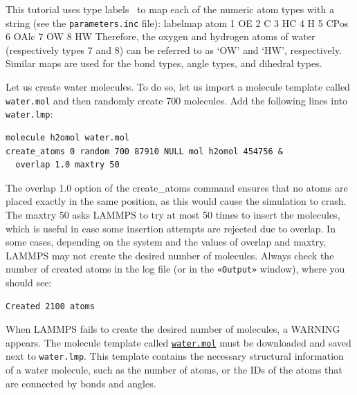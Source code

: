 \documentclass[9pt,tutorial]{livecoms}
\newcommand{\lmpcmd}[1]{\hspace{0pt}\colorbox{listing}{\textcolor{command}{\small{#1}}}\hspace{0pt}} %
\newcommand{\lmpcmdnote}[1]{\hspace{0pt}\colorbox{note_listing}{\textcolor{command}{\small{#1}}}\hspace{0pt}} %
\newcommand{\flecmd}[1]{\textcolor{command}{\texttt{#1}}} %
\newcommand{\guicmd}[1]{\textcolor{command}{\texttt{«#1»}}} %
\newcommand{\dwlcmd}[1]{\textcolor{download}{\texttt{#1}}} %
\newcommand{\filepath}{https://raw.githubusercontent.com/lammpstutorials/lammpstutorials-article/main/files/}
\begin{document}
\begin{note}
This tutorial uses type labels~\cite{typelabel_paper} to map each of the
numeric atom types with a string (see the \flecmd{parameters.inc} file):
\lmpcmdnote{labelmap atom 1 OE 2 C 3 HC 4 H 5 CPos 6 OAlc 7 OW 8 HW}
Therefore, the oxygen and hydrogen atoms of water (respectively types 7 and 8)
can be referred to as `OW' and `HW', respectively.  Similar maps are used for 
the bond types, angle types, and dihedral types.
\end{note}

Let us create water molecules.  To do so, let us import a molecule template called
\flecmd{water.mol} and then randomly create 700 molecules.  Add the following
lines into \flecmd{water.lmp}:
\begin{lstlisting}
molecule h2omol water.mol
create_atoms 0 random 700 87910 NULL mol h2omol 454756 &
  overlap 1.0 maxtry 50
\end{lstlisting}
The \lmpcmd{overlap 1.0} option of the \lmpcmd{create\_atoms} command ensures
that no atoms are placed exactly in the same position, as this would cause the
simulation to crash.  The \lmpcmd{maxtry 50} asks LAMMPS to try at most 50 times
to insert the molecules, which is useful in case some insertion attempts are
rejected due to overlap.  In some cases, depending on the system and the values
of \lmpcmd{overlap} and \lmpcmd{maxtry}, LAMMPS may not create the desired number
of molecules.  Always check the number of created atoms in the \lmpcmd{log} file
(or in the \guicmd{Output} window), where you should see:
\begin{lstlisting}
Created 2100 atoms
\end{lstlisting}
When LAMMPS fails to create the desired number of molecules, a WARNING appears.
The molecule template called \href{\filepath tutorial3/water.mol}{\dwlcmd{water.mol}}
must be downloaded and saved next to \flecmd{water.lmp}.  This template contains
the necessary structural information of a water molecule, such as the number of
atoms, or the IDs of the atoms that are connected by bonds and angles.
\end{document}
